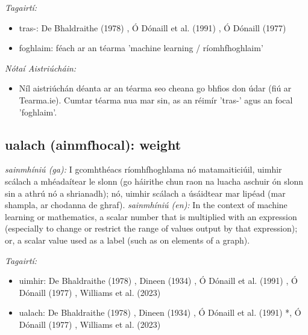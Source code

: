 \documentclass{article}
\begin{document}
 \noindent \textit{Tagairtí:}
\begin{itemize}
	\item tras-: De Bhaldraithe (1978) \cite{de-bhaldraithe}, Ó Dónaill et al. (1991) \cite{focloir-beag}, Ó Dónaill (1977) \cite{odonaill}
	\item foghlaim: féach ar an téarma 'machine learning / ríomhfhoghlaim'
\end{itemize}

 \noindent \textit{Nótaí Aistriúcháin:}
\begin{itemize}
	\item Níl aistriúchán déanta ar an téarma seo cheana go bhfios don údar (fiú ar Tearma.ie). Cumtar téarma nua mar sin, as an réimír 'tras-' agus an focal 'foghlaim'.
\end{itemize}


\subsection*{ualach (ainmfhocal): weight} 
 \noindent \textit{sainmhíniú (ga):} I gcomhthéacs ríomhfhoghlama nó matamaiticiúil, uimhir scálach a mhéadaítear le slonn (go háirithe chun raon na luacha aschuir ón slonn sin a athrú nó a shrianadh); nó, uimhir scálach a úsáidtear mar lipéad (mar shampla, ar chodanna de ghraf).
\newline\newline
 \noindent \textit{sainmhíniú (en):} In the context of machine learning or mathematics, a scalar number that is multiplied with an expression (especially to change or restrict the range of values output by that expression); or, a scalar value used as a label (such as on elements of a graph).
\newline

 \noindent \textit{Tagairtí:}
\begin{itemize}
	\item uimhir: De Bhaldraithe (1978) \cite{de-bhaldraithe}, Dineen (1934) \cite{dineen}, Ó Dónaill et al. (1991) \cite{focloir-beag}, Ó Dónaill (1977) \cite{odonaill}, Williams et al. (2023) \cite{storchiste}
	\item ualach: De Bhaldraithe (1978) \cite{de-bhaldraithe}, Dineen (1934) \cite{dineen}, Ó Dónaill et al. (1991) \cite{focloir-beag}*, Ó Dónaill (1977) \cite{odonaill}, Williams et al. (2023) \cite{storchiste}
\end{itemize}
\end{document}
